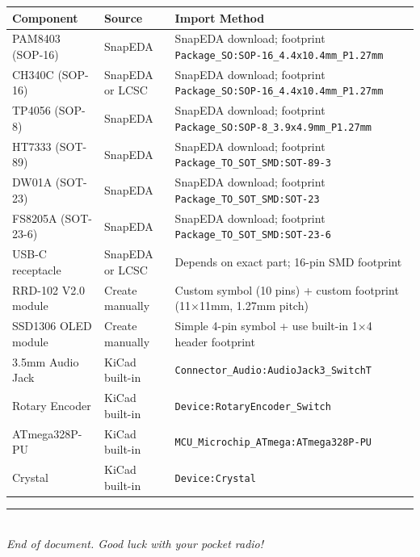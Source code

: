 \documentclass[a4paper,11pt]{article}
\renewcommand*{\,}{ }%
\begin{document}
\begin{longtable}{@{}p{3.5cm}p{3cm}p{6cm}@{}}
\toprule
\textbf{Component} & \textbf{Source} & \textbf{Import Method} \\
\midrule
\endhead
PAM8403 (SOP-16) & SnapEDA & SnapEDA download; footprint \texttt{Package\_SO:SOP-16\_4.4x10.4mm\_P1.27mm} \\
CH340C (SOP-16) & SnapEDA or LCSC & SnapEDA download; footprint \texttt{Package\_SO:SOP-16\_4.4x10.4mm\_P1.27mm} \\
TP4056 (SOP-8) & SnapEDA & SnapEDA download; footprint \texttt{Package\_SO:SOP-8\_3.9x4.9mm\_P1.27mm} \\
HT7333 (SOT-89) & SnapEDA & SnapEDA download; footprint \texttt{Package\_TO\_SOT\_SMD:SOT-89-3} \\
DW01A (SOT-23) & SnapEDA & SnapEDA download; footprint \texttt{Package\_TO\_SOT\_SMD:SOT-23} \\
FS8205A (SOT-23-6) & SnapEDA & SnapEDA download; footprint \texttt{Package\_TO\_SOT\_SMD:SOT-23-6} \\
USB-C receptacle & SnapEDA or LCSC & Depends on exact part; 16-pin SMD footprint \\
RRD-102 V2.0 module & Create manually & Custom symbol (10 pins) + custom footprint (11$\times$11mm, 1.27mm pitch) \\
SSD1306 OLED module & Create manually & Simple 4-pin symbol + use built-in 1$\times$4 header footprint \\
3.5mm Audio Jack & KiCad built-in & \texttt{Connector\_Audio:AudioJack3\_SwitchT} \\
Rotary Encoder & KiCad built-in & \texttt{Device:RotaryEncoder\_Switch} \\
ATmega328P-PU & KiCad built-in & \texttt{MCU\_Microchip\_ATmega:ATmega328P-PU} \\
Crystal & KiCad built-in & \texttt{Device:Crystal} \\
\bottomrule
\end{longtable}

\vfill
\begin{center}
\rule{0.5\textwidth}{0.5pt}\\[0.5cm]
\textit{End of document. Good luck with your pocket radio!}
\end{center}
\end{document}
